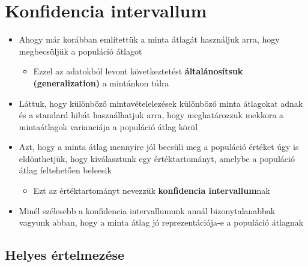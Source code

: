 \documentclass[
  letterpaper,
  DIV=11,
  numbers=noendperiod]{scrreprt}
\providecommand{\tightlist}{%
  \setlength{\itemsep}{0pt}\setlength{\parskip}{0pt}}\usepackage{longtable,booktabs,array}
\begin{document}
\hypertarget{konfidencia-intervallum}{%
\section{Konfidencia intervallum}\label{konfidencia-intervallum}}

\begin{itemize}
\item
  Ahogy már korábban említettük a minta átlagát használjuk arra, hogy
  megbecsüljük a populáció átlagot

  \begin{itemize}
  \tightlist
  \item
    Ezzel az adatokból levont következtetést \textbf{általánosítsuk
    (generalization)} a mintánkon túlra
  \end{itemize}
\item
  Láttuk, hogy különböző mintavételelezések különböző minta átlagokat
  adnak és a standard hibát használhatjuk arra, hogy meghatározzuk
  mekkora a mintaátlagok varianciája a populáció átlag körül
\item
  Azt, hogy a minta átlag mennyire jól becsüli meg a populáció értéket
  úgy is eldönthetjük, hogy kiválasztunk egy értéktartományt, amelybe a
  populáció átlag feltehetően beleesik

  \begin{itemize}
  \tightlist
  \item
    Ezt az értéktartományt nevezzük \textbf{konfidencia intervallum}nak
  \end{itemize}
\item
  Minél szélesebb a konfidencia intervallumunk annál bizonytalanabbak
  vagyunk abban, hogy a minta átlag jó reprezentációja-e a populáció
  átlagnak
\end{itemize}

\hypertarget{helyes-uxe9rtelmezuxe9se}{%
\subsection{Helyes értelmezése}\label{helyes-uxe9rtelmezuxe9se}}
\end{document}

